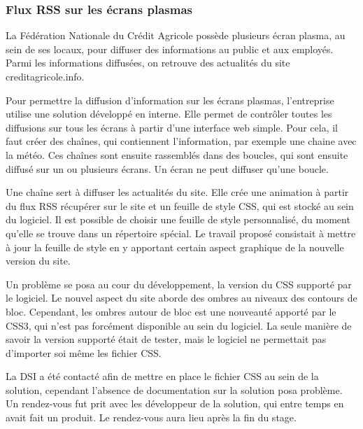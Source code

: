 \documentclass[12pt,a4paper]{article}
\begin{document}
\subsubsection{Flux RSS sur les écrans plasmas}
La Fédération Nationale du Crédit Agricole possède plusieurs écran plasma, au sein de ses locaux, pour diffuser des informations au public et aux employés. Parmi les informations diffusées, on retrouve des actualités du site creditagricole.info.\par 
Pour permettre la diffusion d'information sur les écrans plasmas, l'entreprise utilise une solution développé en interne. Elle permet de contrôler toutes les diffusions sur tous les écrans à partir d'une interface web simple. Pour cela, il faut créer des chaînes, qui contiennent l'information, par exemple une chaine avec la météo. Ces chaînes sont ensuite rassemblés dans des boucles, qui sont ensuite diffusé sur un ou plusieurs écrans. Un écran ne peut diffuser qu'une boucle.\par 
Une chaîne sert à diffuser les actualités du site. Elle crée une animation à partir du flux RSS récupérer sur le site et un feuille de style CSS, qui est stocké au sein du logiciel. Il est possible de choisir une feuille de style personnalisé, du moment qu'elle se trouve dans un répertoire spécial. Le travail proposé consistait à mettre à jour la feuille de style en y apportant certain aspect graphique de la nouvelle version du site.\par 
Un problème se posa au cour du développement, la version du CSS supporté par le logiciel. Le nouvel aspect du site aborde des ombres au niveaux des contours de bloc. Cependant, les ombres autour de bloc est une nouveauté apporté par le CSS3, qui n'est pas forcément disponible au sein du logiciel. La seule manière de savoir la version supporté était de tester, mais le logiciel ne permettait pas d'importer soi même les fichier CSS.\par 
La DSI a été contacté afin de mettre en place le fichier CSS au sein de la solution, cependant l'absence de documentation sur la solution posa problème. Un rendez-vous fut prit avec les développeur de la solution, qui entre temps en avait fait un produit. Le rendez-vous aura lieu après la fin du stage.\par
\end{document}

